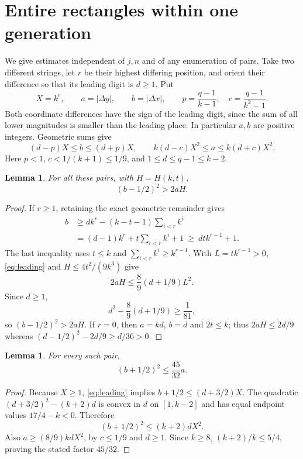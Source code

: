 \documentclass[11pt,a4paper]{article}
\newtheorem{lemma}[theorem]{Lemma}
\theoremstyle{remark}\newtheorem{remark}[theorem]{Remark}
\begin{document}
\section{Entire rectangles within one generation}
We give estimates independent of $j,n$ and of any enumeration of pairs.
Take two different strings, let $r$ be their highest differing position, and
orient their difference so that its leading digit is $d\ge1$. Put
\[
 X=k^r,\qquad a=|\Delta y|,\qquad b=|\Delta x|,
 \qquad p=\frac{q-1}{k-1},\quad c=\frac{q-1}{k^2-1}.
\]
Both coordinate differences have the sign of the leading digit, since the
sum of all lower magnitudes is smaller than the leading place. In particular
$a,b$ are positive integers. Geometric sums give
\begin{equation}\label{eq:leading}
 (d-p)X\le b\le(d+p)X,\qquad
 k(d-c)X^2\le a\le k(d+c)X^2.
\end{equation}
Here $p<1$, $c<1/(k+1)\le1/9$, and $1\le d\le q-1\le k-2$.

\begin{lemma}\label{lem:lower}
For all these pairs, with $H=H(k,t)$,
\[
 (b-1/2)^2>2aH.
\]
\end{lemma}
\begin{proof}
If $r\ge1$, retaining the exact geometric remainder gives
\begin{align*}
 b&\ge dk^r-(k-t-1)\sum_{i<r}k^i\\
  &=(d-1)k^r+t\sum_{i<r}k^i+1
   \ \ge\ dt k^{r-1}+1.
\end{align*}
The last inequality uses $t\le k$ and
$\sum_{i<r}k^i\ge k^{r-1}$. With $L=tk^{r-1}>0$, \eqref{eq:leading} and
$H\le4t^2/(9k^3)$ give
\[
 2aH\le\frac89(d+1/9)L^2.
\]
Since $d\ge1$,
\[
 d^2-\frac89(d+1/9)\ge\frac1{81},
\]
so $(b-1/2)^2>2aH$. If $r=0$, then $a=kd$, $b=d$ and $2t\le k$;
thus $2aH\le2d/9$ whereas
$(d-1/2)^2-2d/9\ge d/36>0$.
\end{proof}

\begin{lemma}\label{lem:upper}
For every such pair,
\[
 (b+1/2)^2\le\frac{45}{32}a.
\]
\end{lemma}
\begin{proof}
Because $X\ge1$, \eqref{eq:leading} implies
$b+1/2\le(d+3/2)X$. The quadratic
$(d+3/2)^2-(k+2)d$ is convex in $d$ on $[1,k-2]$ and has equal endpoint
values $17/4-k<0$. Therefore
\[
 (b+1/2)^2\le(k+2)dX^2.
\]
Also $a\ge(8/9)kdX^2$, by $c\le1/9$ and $d\ge1$. Since $k\ge8$,
$(k+2)/k\le5/4$, proving the stated factor $45/32$.
\end{proof}
\end{document}
